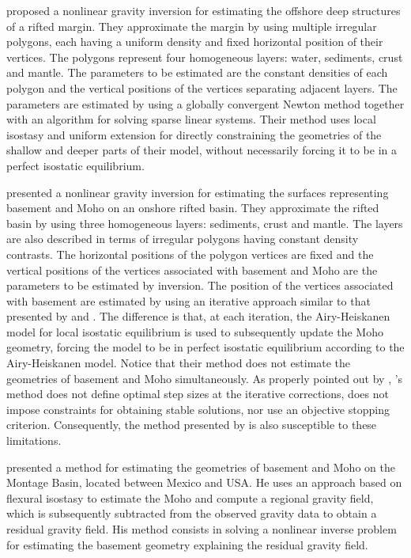 \documentclass[manuscript]{geophysics}
\begin{document}
\citet{condi-etal1999} proposed a nonlinear gravity inversion for estimating the
offshore deep structures of a rifted margin.
They approximate the margin by using multiple irregular polygons, each having a 
uniform density and fixed horizontal position of their vertices.
The polygons represent four homogeneous layers: water, sediments, crust and mantle.
The parameters to be estimated are the constant densities of each polygon and 
the vertical positions of the vertices separating adjacent layers.
The parameters are estimated by using a globally convergent Newton method
together with an algorithm for solving sparse linear systems.
Their method uses local isostasy and uniform extension for directly constraining the 
geometries of the shallow and deeper parts of their model, without necessarily
forcing it to be in a perfect isostatic equilibrium.

\citet{salem-etal2014} presented a nonlinear gravity inversion for estimating the 
surfaces representing basement and Moho on an onshore rifted basin. 
They approximate the rifted basin by using three homogeneous layers: sediments, crust and mantle.
The layers are also described in terms of irregular polygons having constant density
contrasts.
The horizontal positions of the polygon vertices are fixed and the vertical positions
of the vertices associated with basement and Moho are the parameters to be estimated by 
inversion.
The position of the vertices associated with basement are estimated 
by using an iterative approach similar to that
presented by \citet{bott1960} and \citet{cordell-henderson1968}. 
The difference is that, at each iteration, the Airy-Heiskanen model
\citep{heiskanen-moritz1967} for local isostatic equilibrium is used 
to subsequently update the Moho geometry, forcing the model to be in
perfect isostatic equilibrium according to the Airy-Heiskanen model.
Notice that their method does not estimate the geometries of basement and Moho 
simultaneously.
As properly pointed out by \citet{silva-etal2014}, \citeauthor{bott1960}'s
method does not define optimal step sizes at the iterative corrections,
does not impose constraints for obtaining stable solutions, nor use
an objective stopping criterion. 
Consequently, the method presented by \citet{salem-etal2014} is also susceptible 
to these limitations.

\citet{garcia-abdeslem2017} presented a method for estimating the 
geometries of basement and Moho on the Montage Basin, located between Mexico and USA.
He uses an approach based on flexural isostasy to estimate the Moho and compute 
a regional gravity field, which is subsequently subtracted from the observed gravity 
data to obtain a residual gravity field. 
His method consists in solving a nonlinear inverse problem for estimating the
basement geometry explaining the residual gravity field.
\end{document}
